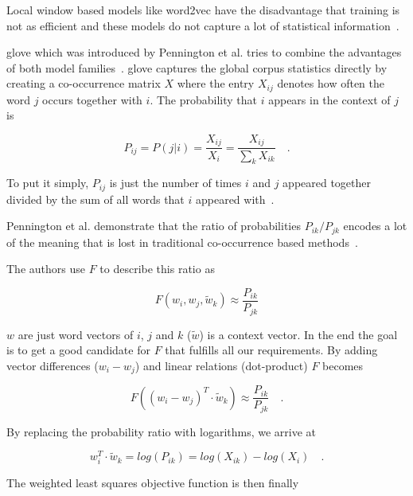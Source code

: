 Local window based models like word2vec have the disadvantage that training is not as efficient and these models do not capture a lot of statistical information~\cite{Pennington2014a}. 
\medskip

\gls{glove} which was introduced by Pennington et al. tries to combine the advantages of both model families~\cite{Pennington2014a}. \gls{glove} captures the global corpus statistics directly by creating a co-occurrence matrix $X$ where the entry $X_{ij}$ denotes how often the word $j$ occurs together with $i$. The probability that $i$ appears in the context of $j$ is 

\begin{equation}
    P_{ij}=P(j|i)=\frac{X_{ij}}{X_i}=\frac{X_{ij}}{\sum_k X_{ik}}\quad.
\end{equation}

To put it simply, $P_{ij}$ is just the number of times $i$ and $j$ appeared together divided by the sum of all words that $i$ appeared with~\cite{Pennington2014a}.

Pennington et al. demonstrate that the ratio of probabilities $P_{ik} / P_{jk}$  encodes a lot of the meaning that is lost in traditional co-occurrence based methods~\cite{Pennington2014a}.
\medskip

The authors use $F$ to describe this ratio as

\begin{equation}
    F(w_i, w_j, \widetilde{w}_k) \approx \frac{P_{ik}}{P_{jk}}
\end{equation}

$w$ are just word vectors of $i$, $j$ and $k$ {($\widetilde{w}$)} is a context vector. In the end the goal is to get a good candidate for $F$ that fulfills all our requirements. By adding vector differences {($w_i - w_j$)} and linear relations {(dot-product)} $F$ becomes

\begin{equation}
    F((w_i - w_j)^T \cdot \widetilde{w}_k) \approx \frac{P_{ik}}{P_{jk}} \quad .
\end{equation}

By replacing the probability ratio with logarithms, we arrive at

\begin{equation}
    w_i^T \cdot \widetilde{w}_k = log(P_{ik}) = log(X_{ik}) - log(X_i) \quad .
\end{equation}

The weighted least squares objective function is then finally

